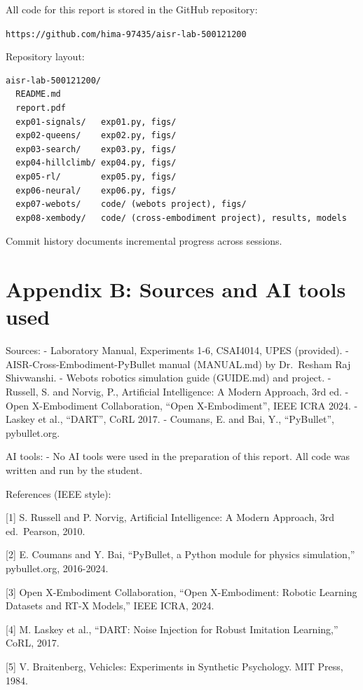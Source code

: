 \documentclass[
]{article}
\begin{document}
All code for this report is stored in the GitHub repository:

\texttt{https://github.com/hima-97435/aisr-lab-500121200}

Repository layout:

\begin{verbatim}
aisr-lab-500121200/
  README.md
  report.pdf
  exp01-signals/   exp01.py, figs/
  exp02-queens/    exp02.py, figs/
  exp03-search/    exp03.py, figs/
  exp04-hillclimb/ exp04.py, figs/
  exp05-rl/        exp05.py, figs/
  exp06-neural/    exp06.py, figs/
  exp07-webots/    code/ (webots project), figs/
  exp08-xembody/   code/ (cross-embodiment project), results, models
\end{verbatim}

Commit history documents incremental progress across sessions.

\section{Appendix B: Sources and AI tools
used}\label{appendix-b-sources-and-ai-tools-used}

Sources: - Laboratory Manual, Experiments 1-6, CSAI4014, UPES
(provided). - AISR-Cross-Embodiment-PyBullet manual (MANUAL.md) by
Dr.~Resham Raj Shivwanshi. - Webots robotics simulation guide (GUIDE.md)
and project. - Russell, S. and Norvig, P., Artificial Intelligence: A
Modern Approach, 3rd ed. - Open X-Embodiment Collaboration, ``Open
X-Embodiment'', IEEE ICRA 2024. - Laskey et al., ``DART'', CoRL 2017. -
Coumans, E. and Bai, Y., ``PyBullet'', pybullet.org.

AI tools: - No AI tools were used in the preparation of this report. All
code was written and run by the student.

References (IEEE style):

{[}1{]} S. Russell and P. Norvig, Artificial Intelligence: A Modern
Approach, 3rd ed.~Pearson, 2010.

{[}2{]} E. Coumans and Y. Bai, ``PyBullet, a Python module for physics
simulation,'' pybullet.org, 2016-2024.

{[}3{]} Open X-Embodiment Collaboration, ``Open X-Embodiment: Robotic
Learning Datasets and RT-X Models,'' IEEE ICRA, 2024.

{[}4{]} M. Laskey et al., ``DART: Noise Injection for Robust Imitation
Learning,'' CoRL, 2017.

{[}5{]} V. Braitenberg, Vehicles: Experiments in Synthetic Psychology.
MIT Press, 1984.
\end{document}
